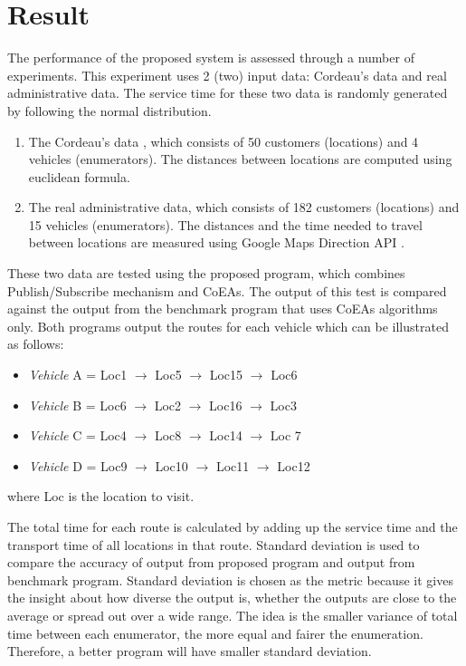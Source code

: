 \documentclass[conference]{IEEEtran}
\begin{document}
\section{Result}
\label{sec:testing}
The performance of the proposed system is assessed through a number of experiments. This experiment uses 2 (two) input data: Cordeau's data and real administrative data. The service time for these two data is randomly generated by following the normal distribution. 


\begin{enumerate}
	\item The Cordeau's data \cite{cordeau_tabu_1997}, which consists of 50 customers (locations) and 4 vehicles (enumerators). The distances between locations are computed using euclidean formula. 
	\item The real administrative data, which consists of 182 customers (locations) and 15 vehicles (enumerators). The distances and the time needed to travel between locations are measured using Google Maps Direction API \cite{google_google_2016}. 
\end{enumerate}


These two data are tested using the proposed program, which combines Publish/Subscribe mechanism and CoEAs. The output of this test is compared against the output from the benchmark program that uses CoEAs algorithms only. Both programs output the routes for each vehicle which can be illustrated as follows:

\begin{itemize}
\item \textit{Vehicle} A = Loc1 $\rightarrow$ Loc5 $\rightarrow$ Loc15 $\rightarrow$ Loc6
\item \textit{Vehicle} B = Loc6 $\rightarrow$ Loc2 $\rightarrow$ Loc16 $\rightarrow$ Loc3
\item \textit{Vehicle} C = Loc4 $\rightarrow$ Loc8 $\rightarrow$ Loc14 $\rightarrow$ Loc 7
\item \textit{Vehicle} D = Loc9 $\rightarrow$ Loc10 $\rightarrow$ Loc11 $\rightarrow$ Loc12
\end{itemize}
where Loc is the location to visit. 

The total time for each route is calculated by adding up the service time and the transport time of all locations in that route. Standard deviation is used to compare the accuracy of output from proposed program and output from benchmark program. Standard deviation is chosen as the metric because it gives the insight about how diverse the output is, whether the outputs are close to the average or spread out over a wide range. The idea is the smaller variance of total time between each enumerator, the more equal and fairer the enumeration. Therefore, a better program will have smaller standard deviation.
\end{document}
